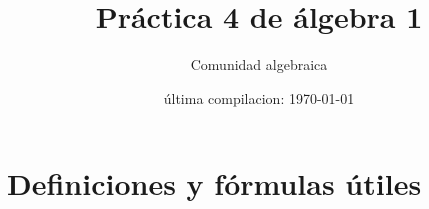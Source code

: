 

\usepackage{polynom} %




\title{Práctica 4 de álgebra 1} %
\author{Comunidad algebraica} %
\date{última compilacion: \today} %

\maketitle  %
\section{Definiciones y fórmulas útiles}

